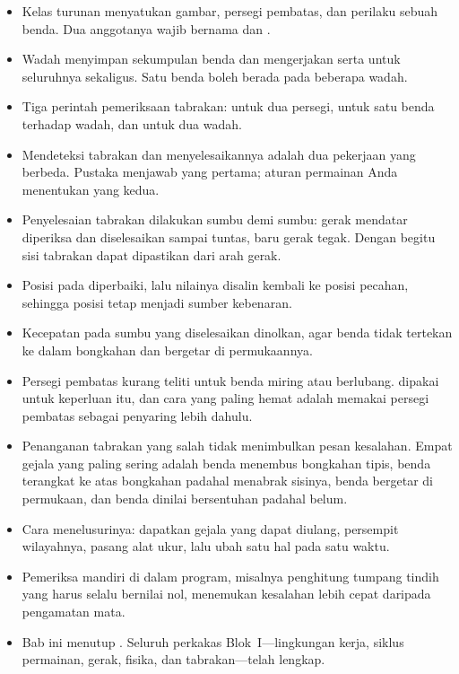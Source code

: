 
\begin{rangkumanbox}
\begin{itemize}
  \item Kelas turunan  menyatukan gambar, persegi
        pembatas, dan perilaku sebuah benda. Dua anggotanya wajib bernama
         dan .
  \item Wadah  menyimpan sekumpulan benda dan
        mengerjakan  serta  untuk seluruhnya
        sekaligus. Satu benda boleh berada pada beberapa wadah.
  \item Tiga perintah pemeriksaan tabrakan:  untuk dua
        persegi,  untuk satu benda terhadap wadah, dan
         untuk dua wadah.
  \item Mendeteksi tabrakan dan menyelesaikannya adalah dua pekerjaan yang
        berbeda. Pustaka menjawab yang pertama; aturan permainan Anda
        menentukan yang kedua.
  \item Penyelesaian tabrakan dilakukan sumbu demi sumbu: gerak mendatar
        diperiksa dan diselesaikan sampai tuntas, baru gerak tegak. Dengan
        begitu sisi tabrakan dapat dipastikan dari arah gerak.
  \item Posisi pada  diperbaiki, lalu nilainya disalin kembali ke
        posisi pecahan, sehingga posisi tetap menjadi sumber kebenaran.
  \item Kecepatan pada sumbu yang diselesaikan dinolkan, agar benda tidak
        tertekan ke dalam bongkahan dan bergetar di permukaannya.
  \item Persegi pembatas kurang teliti untuk benda miring atau berlubang.
         dipakai untuk keperluan itu, dan cara yang paling
        hemat adalah memakai persegi pembatas sebagai penyaring lebih dahulu.
  \item Penanganan tabrakan yang salah tidak menimbulkan pesan kesalahan.
        Empat gejala yang paling sering adalah benda menembus bongkahan tipis,
        benda terangkat ke atas bongkahan padahal menabrak sisinya, benda
        bergetar di permukaan, dan benda dinilai bersentuhan padahal belum.
  \item Cara menelusurinya: dapatkan gejala yang dapat diulang, persempit
        wilayahnya, pasang alat ukur, lalu ubah satu hal pada satu waktu.
  \item Pemeriksa mandiri di dalam program, misalnya penghitung tumpang
        tindih yang harus selalu bernilai nol, menemukan kesalahan lebih cepat
        daripada pengamatan mata.
  \item Bab ini menutup . Seluruh perkakas Blok~I---lingkungan kerja,
        siklus permainan, gerak, fisika, dan tabrakan---telah lengkap.
\end{itemize}
\end{rangkumanbox}
